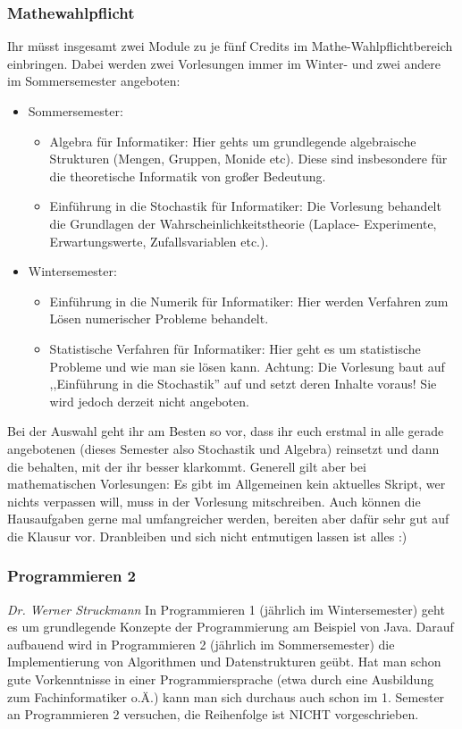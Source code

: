 \begin{multicols}{2}
\subsubsection{Mathewahlpflicht}
Ihr müsst insgesamt zwei Module zu je fünf Credits
	im Mathe-Wahlpflichtbereich einbringen. Dabei werden zwei
	Vorlesungen immer im Winter- und zwei andere im Sommersemester
	angeboten:
	\begin{itemize}
	  \item Sommersemester: 
	    \begin{itemize} 
	      \item Algebra für Informatiker: Hier gehts um grundlegende
		algebraische Strukturen (Mengen, Gruppen, Monide etc). Diese sind insbesondere für die
		theoretische Informatik von großer Bedeutung.
	      \item Einführung in die Stochastik für Informatiker: Die
		Vorlesung behandelt die Grundlagen der
		Wahrscheinlichkeitstheorie (Laplace- Experimente,
		Erwartungswerte, Zufallsvariablen etc.). 
	    \end{itemize}
	  \item Wintersemester: 
	    \begin{itemize}
	      \item Einführung in die Numerik für Informatiker: Hier
		werden Verfahren zum Lösen numerischer Probleme
		behandelt. 
	      \item Statistische Verfahren für Informatiker: Hier geht
		es um statistische Probleme und wie man sie lösen kann.
		Achtung: Die Vorlesung baut auf  ,,Einführung in
		die Stochastik'' auf und setzt deren Inhalte voraus! Sie wird jedoch derzeit nicht angeboten.
	    \end{itemize}
	\end{itemize}
	Bei der Auswahl geht ihr am Besten so vor, dass ihr euch erstmal
	in alle gerade angebotenen (dieses Semester also Stochastik und
	Algebra) reinsetzt und dann die behalten, mit der ihr besser
	klarkommt. Generell gilt aber bei mathematischen Vorlesungen: Es
	gibt im Allgemeinen kein aktuelles Skript, wer nichts verpassen
	will, muss in der Vorlesung mitschreiben. Auch können die
	Hausaufgaben gerne mal umfangreicher werden, bereiten aber dafür
	sehr gut auf die Klausur vor. Dranbleiben und sich nicht
	entmutigen lassen ist alles :)
\subsubsection{Programmieren 2}
	\textit{Dr. Werner Struckmann}
	In Programmieren 1 (jährlich im Wintersemester) geht es um
	grundlegende Konzepte der Programmierung am Beispiel von Java.
	Darauf aufbauend wird in Programmieren 2 (jährlich im
	Sommersemester)  die Implementierung von Algorithmen und
	Datenstrukturen geübt. Hat man schon gute Vorkenntnisse in einer
	Programmiersprache (etwa durch eine Ausbildung zum
	Fachinformatiker o.Ä.) kann man sich durchaus auch schon im 1.
	Semester an Programmieren 2 versuchen, die Reihenfolge ist NICHT
	vorgeschrieben. 


\end{multicols}
